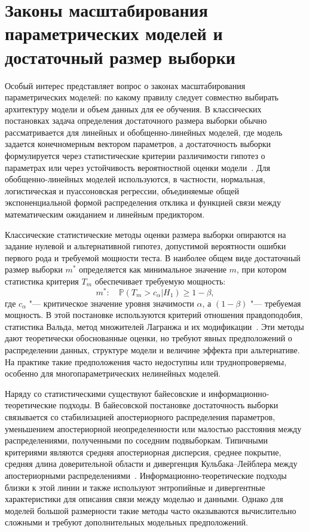 \section{Законы масштабирования параметрических моделей и достаточный размер выборки}\label{sec:scaling-and-sample-size}

Особый интерес представляет вопрос о законах масштабирования параметрических моделей: по какому правилу следует совместно выбирать архитектуру модели и объем данных для ее обучения. В классических постановках задача определения достаточного размера выборки обычно рассматривается для линейных и обобщенно-линейных моделей, где модель задается конечномерным вектором параметров, а достаточность выборки формулируется через статистические критерии различимости гипотез о параметрах или через устойчивость вероятностной оценки модели~\cite{self1988,self1992,shieh2000,shieh2005,demidenko2007,motrenko2014}. Для обобщенно-линейных моделей используются, в частности, нормальная, логистическая и пуассоновская регрессии, объединяемые общей экспоненциальной формой распределения отклика и функцией связи между математическим ожиданием и линейным предиктором.

Классические статистические методы оценки размера выборки опираются на задание нулевой и альтернативной гипотез, допустимой вероятности ошибки первого рода и требуемой мощности теста. В наиболее общем виде достаточный размер выборки $m^*$ определяется как минимальное значение $m$, при котором статистика критерия $T_m$ обеспечивает требуемую мощность:
\begin{equation}
    m^*:\quad \mathbb P(T_m > c_\alpha | H_1)\ge 1-\beta,
\end{equation}
где $c_\alpha$ "--- критическое значение уровня значимости $\alpha$, а $(1-\beta)$ "--- требуемая мощность. В этой постановке используются критерий отношения правдоподобия, статистика Вальда, метод множителей Лагранжа и их модификации~\cite{self1988,self1992,shieh2000,shieh2005,demidenko2007}. Эти методы дают теоретически обоснованные оценки, но требуют явных предположений о распределении данных, структуре модели и величине эффекта при альтернативе. На практике такие предположения часто недоступны или труднопроверяемы, особенно для многопараметрических нелинейных моделей.

Наряду со статистическими существуют байесовские и информационно-теоретические подходы. В байесовской постановке достаточность выборки связывается со стабилизацией апостериорного распределения параметров, уменьшением апостериорной неопределенности или малостью расстояния между распределениями, полученными по соседним подвыборкам. Типичными критериями являются средняя апостериорная дисперсия, среднее покрытие, средняя длина доверительной области и дивергенция Кульбака--Лейблера между апостериорными распределениями~\cite{lindley1997,rubin1998,wang2002,motrenko2014}. Информационно-теоретические подходы близки к этой линии и также используют энтропийные и дивергентные характеристики для описания связи между моделью и данными. Однако для моделей большой размерности такие методы часто оказываются вычислительно сложными и требуют дополнительных модельных предположений.

